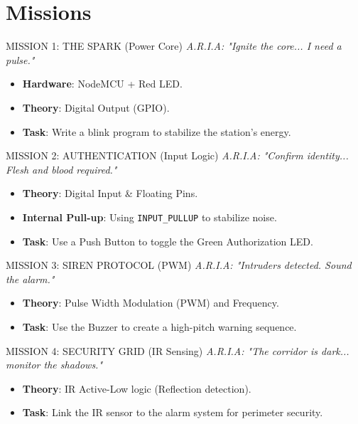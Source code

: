 \documentclass[aspectratio=169]{beamer}
\begin{document}
\section{Missions}
\begin{frame}{MISSION 1: THE SPARK (Power Core)}
    \textit{A.R.I.A: "Ignite the core... I need a pulse."}
    \begin{itemize}
        \item \textbf{Hardware}: NodeMCU + Red LED.
        \item \textbf{Theory}: Digital Output (GPIO).
        \item \textbf{Task}: Write a blink program to stabilize the station's energy.
    \end{itemize}
\end{frame}

\begin{frame}{MISSION 2: AUTHENTICATION (Input Logic)}
    \textit{A.R.I.A: "Confirm identity... Flesh and blood required."}
    \begin{itemize}
        \item \textbf{Theory}: Digital Input \& Floating Pins.
        \item \textbf{Internal Pull-up}: Using \texttt{INPUT\_PULLUP} to stabilize noise.
        \item \textbf{Task}: Use a Push Button to toggle the Green Authorization LED.
    \end{itemize}
\end{frame}

\begin{frame}{MISSION 3: SIREN PROTOCOL (PWM)}
    \textit{A.R.I.A: "Intruders detected. Sound the alarm."}
    \begin{itemize}
        \item \textbf{Theory}: Pulse Width Modulation (PWM) and Frequency.
        \item \textbf{Task}: Use the Buzzer to create a high-pitch warning sequence.
    \end{itemize}
\end{frame}

\begin{frame}{MISSION 4: SECURITY GRID (IR Sensing)}
    \textit{A.R.I.A: "The corridor is dark... monitor the shadows."}
    \begin{itemize}
        \item \textbf{Theory}: IR Active-Low logic (Reflection detection).
        \item \textbf{Task}: Link the IR sensor to the alarm system for perimeter security.
    \end{itemize}
\end{frame}
\end{document}
